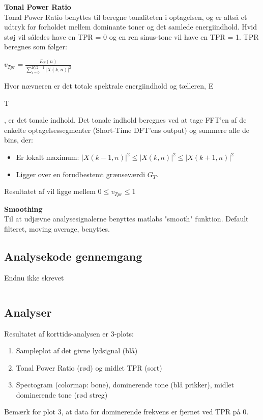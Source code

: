 \textbf{Tonal Power Ratio} \\
Tonal Power Ratio benyttes til beregne tonaliteten i optagelsen, og er altså et udtryk for forholdet mellem dominante toner og det samlede energiindhold. Hvid støj vil således have en TPR = 0 og en ren sinus-tone vil have en TPR = 1. TPR beregnes som følger: 
\begin{center}
${ v }_{ Tpr }=\frac { { E }_{ T }(n) }{ \sum _{ i=0 }^{ K/2-1 }{ { \left| X(k,n) \right|  }^{ 2 } }  } $
\end{center}

Hvor nævneren er det totale spektrale energiindhold og tælleren, E\begin{tiny}T\end{tiny}, er det tonale indhold. Det tonale indhold beregnes ved at tage FFT'en af de enkelte optagelsessegmenter (Short-Time DFT'ens output) og summere alle de bins, der:
\begin{itemize}
	\item Er lokalt maximum: ${ \left| X(k-1,n) \right|  }^{ 2 }\le { \left| X(k,n) \right|  }^{ 2 }\le { \left| X(k+1,n) \right|  }^{ 2 }$
	\item Ligger over en forudbestemt grænseværdi ${ G }_{ T }$.
\end{itemize} 	

Resultatet af vil ligge mellem $0\le { v }_{ Tpr }\le 1$

\textbf{Smoothing} \\
Til at udjævne analysesignalerne benyttes matlabs "smooth" funktion. Default filteret, moving average, benyttes.

\subsection{Analysekode gennemgang}
Endnu ikke skrevet
\begin{verbatim}

\end{verbatim}

\subsection{Analyser}
Resultatet af korttids-analysen er 3-plots:
\begin{enumerate}
	\item Sampleplot af det givne lydsignal (blå)
	\item Tonal Power Ratio (rød) og midlet TPR (sort)
	\item Spectogram (colormap: bone), dominerende tone (blå prikker), midlet dominerende tone (rød streg)
\end{enumerate}
Bemærk for plot 3, at data for dominerende frekvens er fjernet ved TPR på 0.

